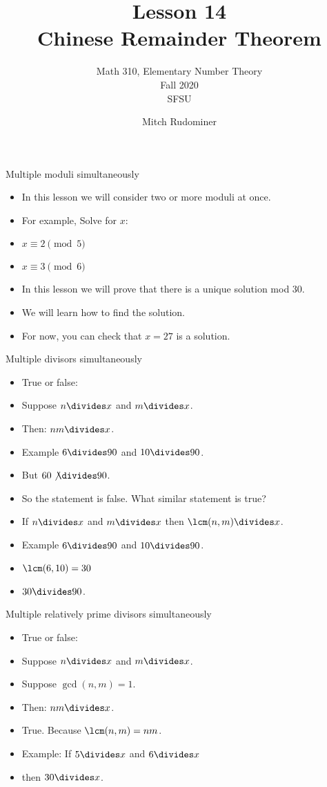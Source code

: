 \documentclass[handout]{beamer}
\title{Lesson 14 \\ Chinese Remainder Theorem}
\subtitle{Math 310, Elementary Number Theory \\ Fall 2020 \\ SFSU}
\author{Mitch Rudominer}
\date{}
\begin{document}
\begin{frame}
  \titlepage
\end{frame}

\begin{frame}{Multiple moduli simultaneously}

\begin{itemize}
  \item In this lesson we will consider two or more moduli at once.
  \item For example, Solve for $x$:
  \item $x \equiv 2 \pmod 5$
  \item $x \equiv 3 \pmod 6$
  \item In this lesson we will prove that there is a unique solution mod 30.
  \item We will learn how to find the solution.
  \item For now, you can check that $x=27$ is a solution.
\end{itemize}

\end{frame}

\begin{frame}{Multiple divisors simultaneously}

\begin{itemize}
  \item True or false:
  \item Suppose $n \divides x$ and $m\divides x$.
  \item Then: $nm \divides x$.
  \item Example $6\divides 90$ and $10\divides 90$.
  \item But $60 \not\divides 90$.
  \item So the statement is false. What similar statement is true?
  \item If $n \divides x$ and $m \divides x$ then $\lcm(n,m) \divides x$.
  \item Example $6\divides 90$ and $10\divides 90$.
  \item $\lcm(6,10) = 30$
  \item $30\divides 90$.
\end{itemize}

\end{frame}

\begin{frame}{Multiple relatively prime divisors simultaneously}

\begin{itemize}
  \item True or false:
  \item Suppose $n \divides x$ and $m\divides x$.
  \item Suppose $\gcd(n,m) = 1$.
  \item Then: $nm \divides x$.
  \item True. Because $\lcm(n,m) = nm$.
  \item Example: If $5\divides x$ and $6\divides x$
  \item then $30 \divides x$.
\end{itemize}

\end{frame}
\end{document}
